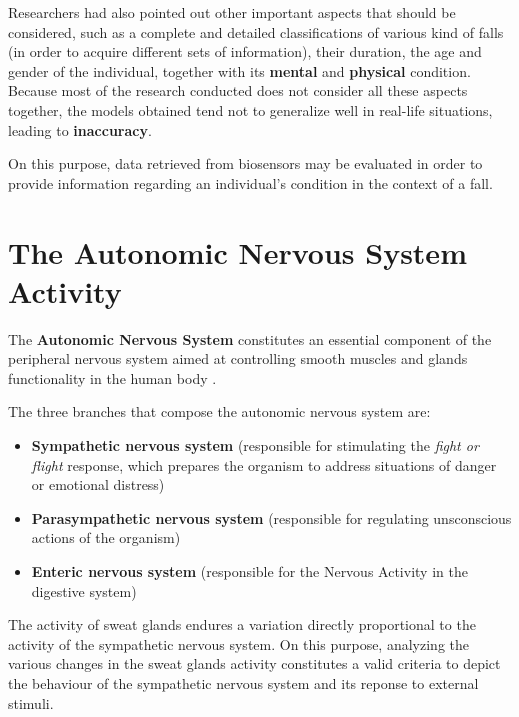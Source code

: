 
Researchers had also pointed out other important aspects that should be considered, such as a complete and detailed classifications of various kind of falls (in order to acquire different sets of information), their duration, the age and gender of the individual, together with its \textbf{mental} and \textbf{physical} condition.
Because most of the research conducted does not consider all these aspects together, the models obtained tend not to generalize well in real-life situations, leading to \textbf{inaccuracy}.

On this purpose, data retrieved from biosensors may be evaluated in order to provide information regarding an individual's condition in the context of a fall.

\section{The Autonomic Nervous System Activity}\label{sec:edaintro}

The \textbf{Autonomic Nervous System} constitutes an essential component of the peripheral nervous system aimed at controlling smooth muscles and glands functionality in the human body \cite{ansWiki}.

The three branches that compose the autonomic nervous system are:

\begin{itemize}
    \item \textbf{Sympathetic nervous system} (responsible for stimulating the \textit{fight or flight} response, which prepares the organism to address situations of danger or emotional distress)
    \item \textbf{Parasympathetic nervous system} (responsible for regulating unsconscious actions of the organism)
    \item \textbf{Enteric nervous system} (responsible for the Nervous Activity in the digestive system)
\end{itemize}

The activity of sweat glands endures a variation directly proportional to the activity of the sympathetic nervous system. On this purpose, analyzing the various changes in the sweat glands activity constitutes a valid criteria to depict the behaviour of the sympathetic nervous system and its reponse to external stimuli.


